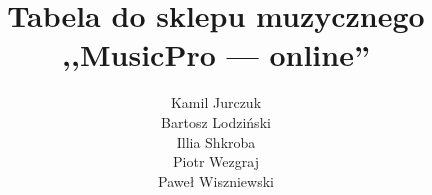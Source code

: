 \documentclass[a4page]{article}
\begin{document}

	\begin{titlepage}
		\title{Tabela do sklepu muzycznego ,,MusicPro --- online''\\}
		\author{Kamil Jurczuk \\ Bartosz Lodziński \\ Illia Shkroba \\ Piotr Wezgraj \\Paweł Wiszniewski}
		\makeatletter
			\centering
			{
				{\Huge{\@title}}
				\vspace{5cm}
				{\LARGE{\@author}}
			}
		\makeatother

	\end{titlepage}

	\clearpage

	\begin{table}[tp!]
	\newcommand\nextrow{\stepcounter{rownumber}\arabic{rownumber}}

		\begin{adjustwidth}{-4.5cm}{}
			\begin{tabular}{|l|l|l|l|}
			

\end{tabular}
\end{adjustwidth}
\end{table}
\end{document}
